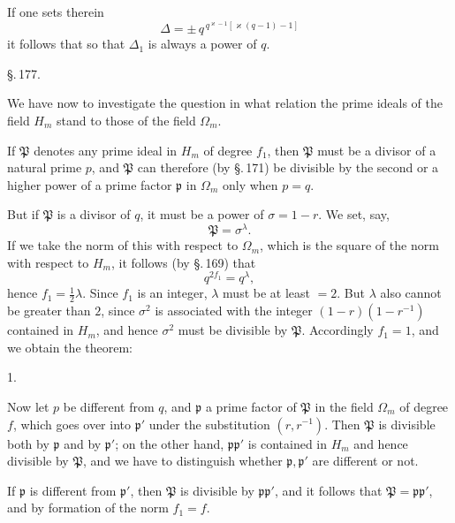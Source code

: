 If one sets therein
\[
\Delta = \pm\,q^{\,q^{\varkappa-1}[\varkappa(q-1)-1]}
\]
it follows that
so that $\Delta_1$ is always a power of $q$.

\begin{center}
\S.\,177.\\[4pt]
\end{center}

We have now to investigate the question in what relation the prime ideals of the field $H_m$ stand to those of the field $\Omega_m$.

If $\mathfrak{P}$ denotes any prime ideal in $H_m$ of degree $f_1$, then $\mathfrak{P}$ must be a divisor of a natural prime $p$, and $\mathfrak{P}$ can therefore (by \S.\,171) be divisible by the second or a higher power of a prime factor $\mathfrak{p}$ in $\Omega_m$ only when $p=q$.

But if $\mathfrak{P}$ is a divisor of $q$, it must be a power of $\sigma=1-r$. We set, say,
\[
\mathfrak{P}=\sigma^\lambda.
\]
If we take the norm of this with respect to $\Omega_m$, which is the square of the norm with respect to $H_m$, it follows (by \S.\,169) that
\[
q^{2f_1}=q^\lambda,
\]
hence $f_1=\frac12\lambda$. Since $f_1$ is an integer, $\lambda$ must be at least $=2$. But $\lambda$ also cannot be greater than $2$, since $\sigma^2$ is associated with the integer $(1-r)(1-r^{-1})$ contained in $H_m$, and hence $\sigma^2$ must be divisible by $\mathfrak{P}$. Accordingly $f_1=1$, and we obtain the theorem:

1. 

Now let $p$ be different from $q$, and $\mathfrak{p}$ a prime factor of $\mathfrak{P}$ in the field $\Omega_m$ of degree $f$, which goes over into $\mathfrak{p}'$ under the substitution $(r,r^{-1})$. Then $\mathfrak{P}$ is divisible both by $\mathfrak{p}$ and by $\mathfrak{p}'$; on the other hand, $\mathfrak{p}\mathfrak{p}'$ is contained in $H_m$ and hence divisible by $\mathfrak{P}$, and we have to distinguish whether $\mathfrak{p}, \mathfrak{p}'$ are different or not.

If $\mathfrak{p}$ is different from $\mathfrak{p}'$, then $\mathfrak{P}$ is divisible by $\mathfrak{p}\mathfrak{p}'$, and it follows that $\mathfrak{P}=\mathfrak{p}\mathfrak{p}'$, and by formation of the norm $f_1=f$.
